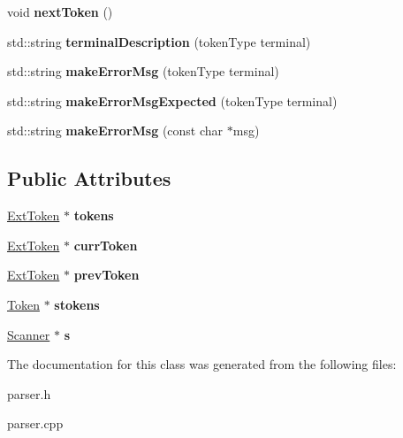 \begin{DoxyCompactItemize}
\item 
\hypertarget{classParser_a324a5bb61c9dfc645300a92aecd6fe69}{void {\bfseries next\-Token} ()}\label{classParser_a324a5bb61c9dfc645300a92aecd6fe69}

\item 
\hypertarget{classParser_a1f45059a13bc0c98355278a9ca9feed9}{std\-::string {\bfseries terminal\-Description} (token\-Type terminal)}\label{classParser_a1f45059a13bc0c98355278a9ca9feed9}

\item 
\hypertarget{classParser_a341bee73e8b1e8558505a237846b16b3}{std\-::string {\bfseries make\-Error\-Msg} (token\-Type terminal)}\label{classParser_a341bee73e8b1e8558505a237846b16b3}

\item 
\hypertarget{classParser_ad38e58ddee85db2aecbd3c7bdcf42116}{std\-::string {\bfseries make\-Error\-Msg\-Expected} (token\-Type terminal)}\label{classParser_ad38e58ddee85db2aecbd3c7bdcf42116}

\item 
\hypertarget{classParser_a60c23daeffb7ced92599e4f2555f71c9}{std\-::string {\bfseries make\-Error\-Msg} (const char $\ast$msg)}\label{classParser_a60c23daeffb7ced92599e4f2555f71c9}

\end{DoxyCompactItemize}
\subsection*{Public Attributes}
\begin{DoxyCompactItemize}
\item 
\hypertarget{classParser_a3606ff327be18af7f76df95f50851633}{\hyperlink{classExtToken}{Ext\-Token} $\ast$ {\bfseries tokens}}\label{classParser_a3606ff327be18af7f76df95f50851633}

\item 
\hypertarget{classParser_a75ab2e2b9385c14e5f967f873340ed11}{\hyperlink{classExtToken}{Ext\-Token} $\ast$ {\bfseries curr\-Token}}\label{classParser_a75ab2e2b9385c14e5f967f873340ed11}

\item 
\hypertarget{classParser_a4bcf7560a5ea1b486bbe4bb54a5a22eb}{\hyperlink{classExtToken}{Ext\-Token} $\ast$ {\bfseries prev\-Token}}\label{classParser_a4bcf7560a5ea1b486bbe4bb54a5a22eb}

\item 
\hypertarget{classParser_a0910de176dcc1cdfbf7ad99622ce9dd5}{\hyperlink{classToken}{Token} $\ast$ {\bfseries stokens}}\label{classParser_a0910de176dcc1cdfbf7ad99622ce9dd5}

\item 
\hypertarget{classParser_ab2ef99ea9e732f5fd176b3949a6c32af}{\hyperlink{classScanner}{Scanner} $\ast$ {\bfseries s}}\label{classParser_ab2ef99ea9e732f5fd176b3949a6c32af}

\end{DoxyCompactItemize}


The documentation for this class was generated from the following files\-:\begin{DoxyCompactItemize}
\item 
parser.\-h\item 
parser.\-cpp\end{DoxyCompactItemize}
